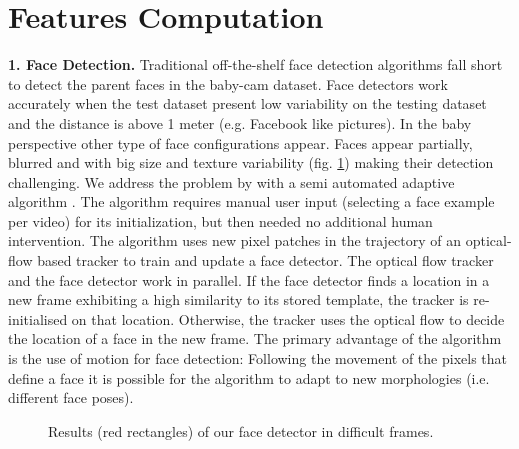 \documentclass[10pt,letterpaper]{article}
\begin{document}
\section{Features Computation}
{\bf 1. Face Detection.} Traditional off-the-shelf face detection algorithms fall short to detect the parent faces in the baby-cam dataset. Face detectors work accurately when the test dataset present low variability on the testing dataset and the distance is above 1 meter (e.g. Facebook like pictures). In the baby perspective other type of face configurations appear. Faces appear partially, blurred and with big size and texture variability (fig. \ref{fig:faces}) making their detection challenging. We address the problem by with a semi automated adaptive algorithm \cite{kalal}. The algorithm requires manual user input (selecting a face example per video) for its initialization, but then needed no additional human intervention. The algorithm uses new pixel patches in the trajectory of an optical-flow based tracker to train and update a face detector. The optical flow tracker and the face detector work in parallel. If the face detector finds a location in a new frame exhibiting a high similarity to its stored template, the tracker is re-initialised on that location. Otherwise, the tracker uses the optical flow to decide the location of a face in the new frame. The primary advantage of the algorithm is the use of motion for face detection: Following the movement of the pixels that define a face it is possible for the algorithm to adapt to new morphologies (i.e. different face poses).
\begin{figure}[h]
    
    \caption{Results (red rectangles) of our face detector in difficult frames.
 }
\label{fig:faces}
\end{figure}
\end{document}
